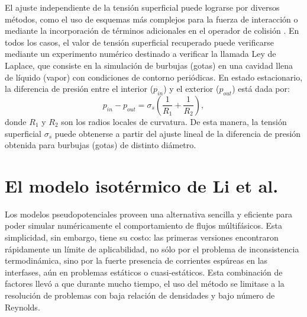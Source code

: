 El ajuste independiente de la tensi\'on superficial puede lograrse por diversos m\'etodos, como el uso de esquemas m\'as complejos para la fuerza de interacci\'on \cite{sbragaglia_generalized_2007, hu_contact_2016} o mediante la incorporaci\'on  de t\'erminos adicionales en el operador de colisi\'on \cite{li_achieving_2013}. En todos los casos, el valor de tensi\'on superficial recuperado puede verificarse mediante un experimento num\'erico destinado a verificar la llamada Ley de Laplace, que consiste en la simulaci\'on de burbujas (gotas) en una cavidad llena de l\'iquido (vapor) con condiciones de contorno peri\'odicas. En estado estacionario, la diferencia de presi\'on entre el interior ($p_{in}$) y el exterior ($p_{out}$) est\'a dada por:
\begin{equation}
	p_{in}-p_{out} = \sigma_s \left( \dfrac{1}{R_1} + \dfrac{1}{R_2}\right),
	\label{eq:laplace}
\end{equation}
donde $R_1$ y $R_2$ son los radios locales de curvatura. De esta manera, la tensi\'on superficial $\sigma_s$ puede obtenerse a partir del ajuste lineal de la diferencia de presi\'on obtenida para burbujas (gotas) de distinto di\'ametro. 





\section{El modelo isot\'ermico de Li et al.}

Los modelos pseudopotenciales proveen una alternativa sencilla y eficiente para poder simular num\'ericamente el comportamiento de flujos m\'ultif\'asicos. Esta simplicidad, sin embargo, tiene su costo: las primeras versiones encontraron r\'apidamente un l\'imite de aplicabilidad, no s\'olo por el problema de inconsistencia termodin\'amica, sino por la fuerte presencia de corrientes esp\'ureas en las interfases, a\'un en problemas est\'aticos o cuasi-est\'aticos. Esta combinaci\'on de factores llev\'o a que durante mucho tiempo, el uso del m\'etodo \pp{} se limitase a la resoluci\'on de problemas con baja relaci\'on de densidades y bajo n\'umero de Reynolds.

